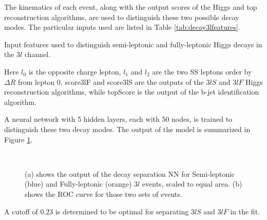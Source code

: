 The kinematics of each event, along with the output scores of the Higgs and top reconstruction algorithms, are used to distinguish these two possible decay modes. The particular inputs used are listed in Table \ref{tab:decay3lfeatures}.

\begin{table}[H]

\caption{Input features used to distinguish semi-leptonic and fully-leptonic Higgs decays in the $3l$  channel.}
\label{tab:decay3lfeatures}
\end{table}

Here $l_0$ is the opposite charge lepton, $l_1$ and $l_2$ are the two SS leptons order by $\Delta R$ from lepton 0. score3lF and score3lS are the outputs of the $3lS$ and $3lF$ Higgs reconstruction algorithms, while topScore is the output of the b-jet identification algorithm.

A neural network with 5 hidden layers, each with 50 nodes, is trained to distinguish these two decay modes. The output of the model is summarized in Figure \ref{fig:decayResults}.

\begin{figure}[H]
    \centering
    \\
    \caption{(a) shows the output of the decay separation NN for Semi-leptonic (blue) and Fully-leptonic (orange) $3l$  events, scaled to equal area. (b) shows the ROC curve for those two sets of events.}
    \label{fig:decayResults}
\end{figure}

A cutoff of 0.23 is determined to be optimal for separating $3lS$ and $3lF$ in the fit.



